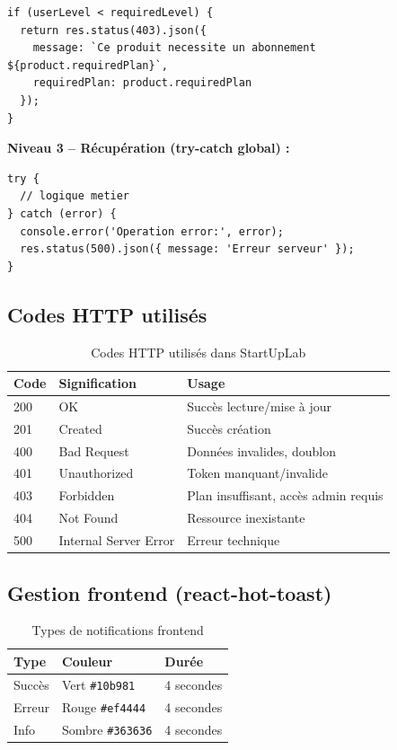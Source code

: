 \begin{verbatim}
if (userLevel < requiredLevel) {
  return res.status(403).json({
    message: `Ce produit necessite un abonnement ${product.requiredPlan}`,
    requiredPlan: product.requiredPlan
  });
}
\end{verbatim}

\textbf{Niveau 3 -- Récupération (try-catch global) :}

\begin{verbatim}
try {
  // logique metier
} catch (error) {
  console.error('Operation error:', error);
  res.status(500).json({ message: 'Erreur serveur' });
}
\end{verbatim}

\subsection{Codes HTTP utilisés}

\begin{table}[H]
\centering
\caption{Codes HTTP utilisés dans StartUpLab}
\label{tab:http-codes}
\begin{tabular}{|l|l|l|}
\hline
\textbf{Code} & \textbf{Signification} & \textbf{Usage} \\
\hline
200 & OK & Succès lecture/mise à jour \\
\hline
201 & Created & Succès création \\
\hline
400 & Bad Request & Données invalides, doublon \\
\hline
401 & Unauthorized & Token manquant/invalide \\
\hline
403 & Forbidden & Plan insuffisant, accès admin requis \\
\hline
404 & Not Found & Ressource inexistante \\
\hline
500 & Internal Server Error & Erreur technique \\
\hline
\end{tabular}
\end{table}

\subsection{Gestion frontend (react-hot-toast)}

\begin{table}[H]
\centering
\caption{Types de notifications frontend}
\label{tab:toast}
\begin{tabular}{|l|l|l|}
\hline
\textbf{Type} & \textbf{Couleur} & \textbf{Durée} \\
\hline
Succès & Vert \texttt{\#10b981} & 4 secondes \\
\hline
Erreur & Rouge \texttt{\#ef4444} & 4 secondes \\
\hline
Info & Sombre \texttt{\#363636} & 4 secondes \\
\hline
\end{tabular}
\end{table}

